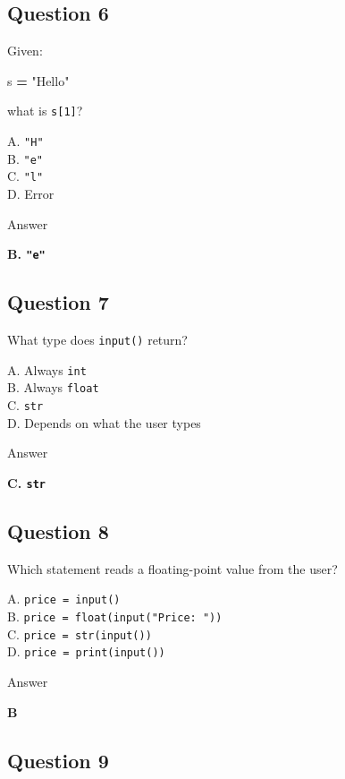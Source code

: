 \documentclass[
]{article}
\newenvironment{Shaded}{\begin{snugshade}}{\end{snugshade}}
\newcommand{\NormalTok}[1]{#1}
\newcommand{\OperatorTok}[1]{\textcolor[rgb]{0.81,0.36,0.00}{\textbf{#1}}}
\newcommand{\StringTok}[1]{\textcolor[rgb]{0.31,0.60,0.02}{#1}}
\begin{document}
\subsection{Question 6}\label{question-6}

Given:

\begin{Shaded}
\begin{Highlighting}[]
\NormalTok{s }\OperatorTok{=} \StringTok{"Hello"}
\end{Highlighting}
\end{Shaded}

what is \texttt{s{[}1{]}}?

A. \texttt{"H"}\\
B. \texttt{"e"}\\
C. \texttt{"l"}\\
D. Error

Answer

\textbf{B. \texttt{"e"}}

\subsection{Question 7}\label{question-7}

What type does \texttt{input()} return?

A. Always \texttt{int}\\
B. Always \texttt{float}\\
C. \texttt{str}\\
D. Depends on what the user types

Answer

\textbf{C. \texttt{str}}

\subsection{Question 8}\label{question-8}

Which statement reads a floating-point value from the user?

A. \texttt{price\ =\ input()}\\
B. \texttt{price\ =\ float(input("Price:\ "))}\\
C. \texttt{price\ =\ str(input())}\\
D. \texttt{price\ =\ print(input())}

Answer

\textbf{B}

\subsection{Question 9}\label{question-9}
\end{document}
